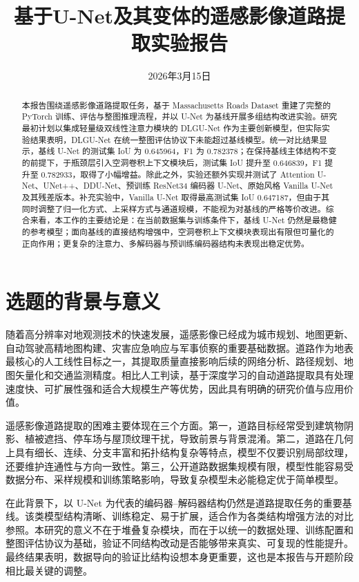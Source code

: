 \documentclass[12pt,a4paper]{ctexart}
\title{基于U-Net及其变体的遥感影像道路提取实验报告}
\author{}
\date{2026年3月15日}
\begin{document}
\maketitle

\begin{abstract}
本报告围绕遥感影像道路提取任务，基于 Massachusetts Roads Dataset 重建了完整的 PyTorch 训练、评估与整图推理流程，并以 U-Net 为基线开展多组结构改进实验。研究最初计划以集成轻量级双线性注意力模块的 DLGU-Net 作为主要创新模型，但实际实验结果表明，DLGU-Net 在统一整图评估协议下未能超过基线模型。统一对比结果显示，基线 U-Net 的测试集 IoU 为 0.645964，F1 为 0.782378；在保持基线主体结构不变的前提下，于瓶颈层引入空洞卷积上下文模块后，测试集 IoU 提升至 0.646839，F1 提升至 0.782933，取得了小幅增益。除此之外，实验还额外实现并测试了 Attention U-Net、UNet++、DDU-Net、预训练 ResNet34 编码器 U-Net、原始风格 Vanilla U-Net 及其残差版本。补充实验中，Vanilla U-Net 取得最高测试集 IoU 0.647187，但由于其同时调整了归一化方式、上采样方式与通道规模，不能视为对基线的严格等价改进。综合来看，本工作的主要结论是：在当前数据集与训练条件下，基线 U-Net 仍然是最稳健的参考模型；面向基线的直接结构增强中，空洞卷积上下文模块表现出有限但可量化的正向作用；更复杂的注意力、多解码器与预训练编码器结构未表现出稳定优势。
\end{abstract}

\tableofcontents
\newpage

\section{选题的背景与意义}
随着高分辨率对地观测技术的快速发展，遥感影像已经成为城市规划、地图更新、自动驾驶高精地图构建、灾害应急响应与军事侦察的重要基础数据。道路作为地表最核心的人工线性目标之一，其提取质量直接影响后续的网络分析、路径规划、地图矢量化和交通监测精度。相比人工判读，基于深度学习的自动道路提取具有处理速度快、可扩展性强和适合大规模生产等优势，因此具有明确的研究价值与应用价值。

遥感影像道路提取的困难主要体现在三个方面。第一，道路目标经常受到建筑物阴影、植被遮挡、停车场与屋顶纹理干扰，导致前景与背景混淆。第二，道路在几何上具有细长、连续、分支丰富和拓扑结构复杂等特点，模型不仅要识别局部纹理，还要维护连通性与方向一致性。第三，公开道路数据集规模有限，模型性能容易受数据分布、采样规模和训练策略影响，导致复杂模型未必能稳定优于简单模型。

在此背景下，以 U-Net 为代表的编码器--解码器结构仍然是道路提取任务的重要基线。该类模型结构清晰、训练稳定、易于扩展，适合作为各类结构增强方法的对比参照。本研究的意义不在于堆叠复杂模块，而在于以统一的数据处理、训练配置和整图评估协议为基础，验证不同结构改动是否能够带来真实、可复现的性能提升。最终结果表明，数据导向的验证比结构设想本身更重要，这也是本报告与开题阶段相比最关键的调整。
\end{document}
